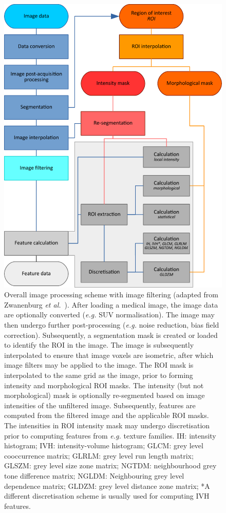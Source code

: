\documentclass[fleqn,a4paper,oneside,openany]{book}
\begin{document}
\begin{figure}
\centering
\includegraphics[]{Image_processing_with_filtering.pdf}
\caption{Overall image processing scheme with image filtering (adapted from Zwanenburg \textit{et al.}~\cite{ZLV2017}). After loading a medical image, the image data are optionally converted (\textit{e.g.} SUV normalisation). The image may then undergo further post-processing (\textit{e.g.} noise reduction, bias field correction). Subsequently, a segmentation mask is created or loaded to identify the ROI in the image. The image is subsequently interpolated to ensure that image voxels are isometric, after which image filters may be applied to the image. The ROI mask is interpolated to the same grid as the image, prior to forming intensity and morphological ROI masks. The intensity (but not morphological) mask is optionally re-segmented based on image intensities of the unfiltered image. Subsequently, features are computed from the filtered image and the applicable ROI masks. The intensities in ROI intensity mask may undergo discretisation prior to computing features from \textit{e.g.} texture families. IH: intensity histogram; IVH: intensity-volume histogram; GLCM: grey level cooccurrence matrix; GLRLM: grey level run length matrix; GLSZM: grey level size zone matrix; NGTDM: neighbourhood grey tone difference matrix; NGLDM: Neighbouring grey level dependence matrix; GLDZM: grey level distance zone matrix; *A different discretisation scheme is usually used for computing IVH features.}
\label{fig:imageProcessing}
\end{figure}
\end{document}
